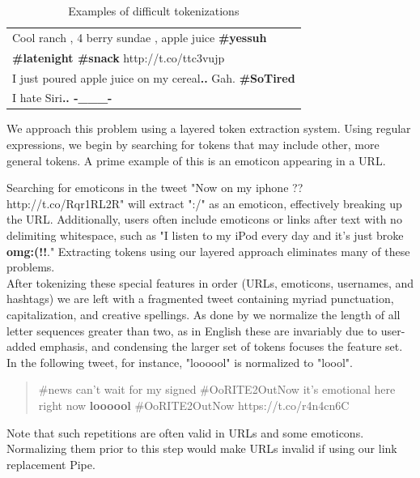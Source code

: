 \documentclass[letterpaper]{article}
\begin{document}
\begin{table}[h]
\centering
\begin{tabular}{|l|}
	\hline
	Cool ranch , 4 berry sundae , apple juice \textbf{\#yessuh} \\ 
	\textbf{\#latenight \#snack} http://t.co/ttc3vujp \\ \hline
	I just poured apple juice on my cereal\textbf{..} Gah. \textbf{\#SoTired} \\ \hline
	I hate Siri\textbf{.. -\_\_\_-} \\
	\hline
\end{tabular}
\caption{Examples of difficult tokenizations}
\label{tab:tokenization_examples}
\end{table}

We approach this problem using a layered token extraction system. Using regular expressions, we begin by searching for tokens that may include other, more general tokens. A prime example of this is an emoticon appearing in a URL.

Searching for emoticons in the tweet "Now on my iphone ?? http://t.co/Rqr1RL2R" will extract ":/" as an emoticon, effectively breaking up the URL. Additionally, users often include emoticons or links after text with no delimiting whitespace, such as "I listen to my iPod every day and it's just broke \textbf{omg:(!!}." Extracting tokens using our layered approach eliminates many of these problems.\\

After tokenizing these special features in order (URLs, emoticons, usernames, and hashtags) we are left with a fragmented tweet containing myriad punctuation, capitalization, and creative spellings. As done by \citet{potts2011} we normalize the length of all letter sequences greater than two, as in English these are invariably due to user-added emphasis, and condensing the larger set of tokens focuses the feature set. In the following tweet, for instance, "loooool" is normalized to "loool".
\begin{quote}
\#news can't wait for my signed \#OoRITE2OutNow it's emotional here right now \textbf{loooool} \#OoRITE2OutNow https://t.co/r4n4cn6C 
\end{quote}

Note that such repetitions are often valid in URLs and some emoticons. Normalizing them prior to this step would make URLs invalid if using our link replacement Pipe.
\end{document}
